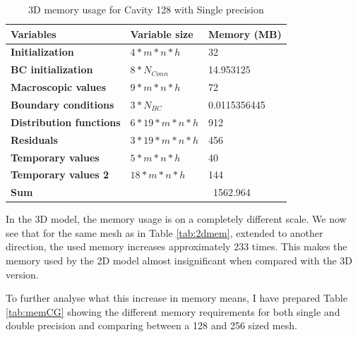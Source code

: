 \documentclass[12pt, openany]{book}
\begin{document}
\begin{table}[H]
	\centering
	\begin{tabular}{|l|l|l|}
		\hline
		\textbf{Variables}              & \textbf{Variable size}   & \textbf{Memory (MB)} \\ \hline
		\textbf{Initialization}         & $4 * m * n * h$          & 32                   \\ \hline
		\textbf{BC initialization}      & $8 * N_{Conn}$           & 14.953125            \\ \hline
		\textbf{Macroscopic values}     & $9 * m * n * h$          & 72                   \\ \hline
		\textbf{Boundary conditions}    & $3 * N_{BC}$             & 0.0115356445         \\ \hline
		\textbf{Distribution functions} & $6 * 19 * m * n * h$     & 912                  \\ \hline
		\textbf{Residuals}              & $3 * 19 * m * n * h$     & 456                  \\ \hline
		\textbf{Temporary values}       & $5 * m * n * h$          & 40                   \\ \hline
		\textbf{Temporary values 2}     & $18 * m * n * h$         & 144                  \\ \hline
		\textbf{Sum}                    &                          & ~1562.964      \\ \hline
	\end{tabular}
	\caption{3D memory usage for Cavity 128 with Single precision}
	\label{tab:3dmem}
\end{table}

In the 3D model, the memory usage is on a completely different scale. We now see that for the same mesh as in Table \ref{tab:2dmem}, extended to another direction, the used memory increases approximately 233 times. This makes the memory used by the 2D model almost insignificant when compared with the 3D version.\par
To further analyse what this increase in memory means, I have prepared Table \ref{tab:memCG} showing the different memory requirements for both single and double precision and comparing between a 128 and 256 sized mesh.
\end{document}
